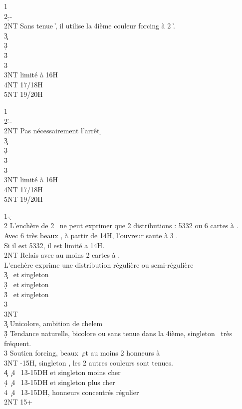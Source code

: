 \documentclass[a4paper]{article}
\begin{document}
\begin{bidtable}
1\c\\
2\d--\\
2NT \> Sans tenue \h , il utilise la 4ième couleur forcing à 2 \h .\+\\
3\c {}\\
3\d {}\\
3\h {}\\
3\s {}\\
3NT  limité à 16H\\
4NT  17/18H\\
5NT  19/20H\-
\end{bidtable}

\begin{bidtable}
1\c\\
2\h--\\
2NT \> Pas nécessairement l’arrêt \d \+\\
3\c {}\\
3\d {}\\
3\h {}\\
3\s {}\\
3NT  limité à 16H\\
4NT  17/18H\\
5NT  19/20H\-
\end{bidtable}

\begin{bidtable}
1\c--\\
2\s \> L’enchère de 2 \s\ ne peut exprimer que 2 distributions : 5332 ou 6 cartes à \s .\\
\>Avec 6 très beaux \s , à partir de 14H, l’ouvreur saute à 3 \s .\\
\>Si il est 5332, il est limité a 14H.\+\\
2NT \> Relais avec au moins 2 cartes à \s .\+\\
L’enchère \> exprime une distribution régulière ou semi-régulière\\
3\c {} \s\ et singleton \c \\
3\d {} \s\ et singleton \d \\
3\h {} \s\ et singleton \h \\
3\s {}\\
3NT \-\\
3\c \> Unicolore, ambition de chelem\\
3\d\h \> Tendance naturelle, bicolore ou sans tenue dans la 4ième, singleton \s\ très fréquent.\\
3\s \> Soutien forcing, beaux \c\ et au moins 2 honneurs à \s \\
3NT -15H, singleton \s , les 2 autres couleurs sont tenues.\\
4\c {} \c\ 4 \s\ 13-15DH et singleton moins cher\\
4\d {} \c\ 4 \s\ 13-15DH et singleton plus cher\\
4\s {} \c\ 4 \s\ 13-15DH, honneurs concentrés régulier\-\\
2NT  15+
\end{bidtable}
\end{document}
